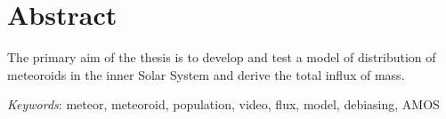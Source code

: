 \section*{Abstract}
    The primary aim of the thesis is to develop and test a model of distribution
    of meteoroids in the inner Solar System and derive the total influx of mass.


    \emph{Keywords}: meteor, meteoroid, population, video, flux, model, debiasing, AMOS
